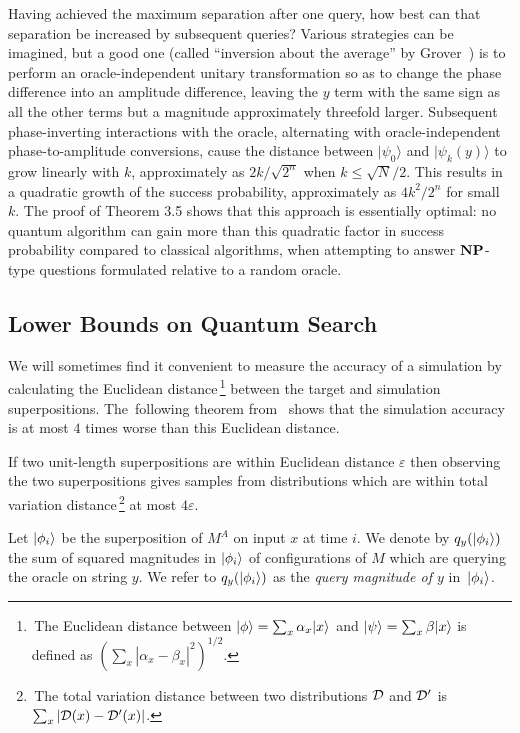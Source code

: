 Having achieved the maximum separation after one query, how best can
that separation be increased by subsequent queries?  Various strategies
can be imagined, but a good one (called ``inversion about the average''
by Grover~\cite{Gr})
is to perform an oracle-independent unitary transformation so as to
change the phase difference into an amplitude difference, leaving the
$y$ term with the same sign as all the other terms but a magnitude
approximately threefold larger.  Subsequent phase-inverting
interactions with the oracle, alternating with oracle-independent
phase-to-amplitude conversions, cause the distance between
$|\psi_0\rangle$ and $|\psi_k(y)\rangle$ to grow linearly with $k$,
approximately as $2k/\sqrt{2^n}$ when \mbox{$k \le \sqrt{N}/2$}.
This results in a quadratic growth of the success probability,
approximately as $4k^2/2^n$ for small~$k$.  The proof
of Theorem 3.5 shows that this approach is
essentially optimal: no quantum algorithm can gain more than
this quadratic factor in success probability compared to classical algorithms,
when attempting to answer $\mbox{\bf NP}$-type questions formulated
relative to a random oracle.

\subsection{Lower Bounds on Quantum Search}

We will sometimes find it convenient to measure the accuracy of a simulation
by calcu\-lating the Euclidean distance\,\footnote{\,The Euclidean distance
between $|\phi\rangle = \sum_x \alpha_x {| x \rangle}$ and
$|\psi\rangle = \sum_x \beta {| x \rangle}$ is defined as
\mbox{$(\sum_x |\alpha_x - \beta_x|^2)^{1/2}$}.\phantom{\Large X}}
between the target and simulation
superpositions.  The~following theorem from~\cite{BV} shows that the simulation
accuracy is at most $4$ times worse than this Euclidean distance.

\begin{theorem}
\label{total.var.dist}
If two unit-length superpositions
are within Euclidean distance $\varepsilon$ then
observing the two superpositions gives samples from distributions which
are within total variation distance\,\footnote{\,The total variation distance
between two distributions $\cal{D}$ and $\cal{D'}$ is
$\sum_x |{\cal D}(x) -{\cal D'}(x)|$.\phantom{\Large X}}
at most $4 \varepsilon$.
\end{theorem}

\begin{definition}
Let ${| \phi_i \rangle}$ be the superposition of $M^A$ on input $x$
at time $i$. We denote by $q_y ({| \phi_i \rangle})$ the sum of
squared magnitudes in
${| \phi_i \rangle}$ of configurations of $M$ which are querying
the oracle on string $y$.
We refer to $q_y ({| \phi_i \rangle})$ as the
{\em query magnitude of $y$\/} in~${| \phi_i \rangle}$.
\end{definition}


